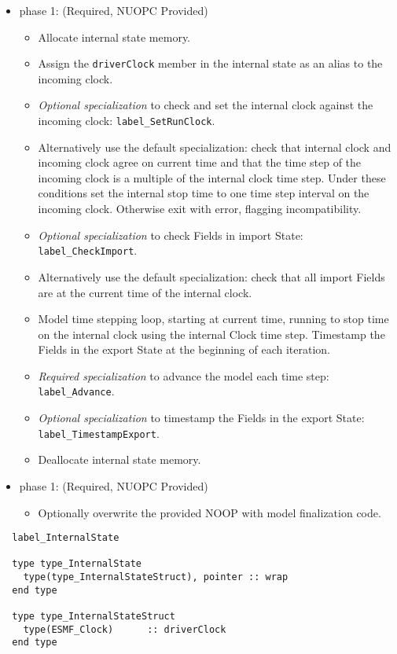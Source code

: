 \begin{itemize}
\item phase 1: ({\sc Required, NUOPC Provided})
  \begin{itemize}
  \item Allocate internal state memory.
  \item Assign the {\tt driverClock} member in the internal state as an alias to the incoming clock.
  \item {\it Optional specialization} to check and set the internal clock against the incoming clock: {\tt label\_SetRunClock}.
  \item Alternatively use the default specialization: check that internal clock and incoming clock agree on current time and that the time step of the incoming clock is a multiple of the internal clock time step. Under these conditions set the internal stop time to one time step interval on the incoming clock. Otherwise exit with error, flagging incompatibility.
  \item {\it Optional specialization} to check Fields in import State: {\tt label\_CheckImport}.
  \item Alternatively use the default specialization: check that all import Fields are at the current time of the internal clock.
  \item Model time stepping loop, starting at current time, running to stop time on the internal clock using the internal Clock time step. Timestamp the Fields in the export State at the beginning of each iteration.
  \item {\it Required specialization} to advance the model each time step: {\tt label\_Advance}.
  \item {\it Optional specialization} to timestamp the Fields in the export State: {\tt label\_TimestampExport}.
  \item Deallocate internal state memory.
  \end{itemize}    
\end{itemize}

\begin{itemize}
\item phase 1: ({\sc Required, NUOPC Provided})
  \begin{itemize}
  \item Optionally overwrite the provided NOOP with model finalization code.
  \end{itemize}      
\end{itemize}

\begin{verbatim}  label_InternalState

  type type_InternalState
    type(type_InternalStateStruct), pointer :: wrap
  end type

  type type_InternalStateStruct
    type(ESMF_Clock)      :: driverClock
  end type

\end{verbatim}

